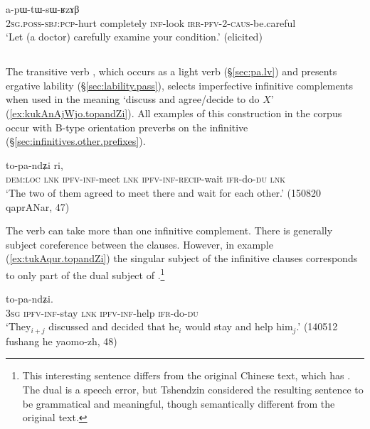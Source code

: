 \begin{exe} 
\ex \label{ex:kArtoR.apWtWsWRzAB}
 a-pɯ-tɯ-sɯ-ʁzɤβ \\
\textsc{2sg}.\textsc{poss}-\textsc{sbj}:\textsc{pcp}-hurt completely \textsc{inf}-look \textsc{irr}-\textsc{pfv}-2-\textsc{caus}-be.careful \\
\glt `Let (a doctor) carefully examine your condition.' (elicited)
\end{exe} 


\subsection{} \label{sec:pa.complements}
The transitive verb , which occurs as a light verb (§\ref{sec:pa.lv}) and presents ergative lability (§\ref{sec:lability.pass}), selects imperfective infinitive complements when used in the meaning `discuss and agree/decide to do $X$' (\ref{ex:kukAnAjWjo.topandZi}). All examples of this construction in the corpus occur with B-type orientation preverbs on the infinitive (§\ref{sec:infinitives.other.prefixes}). 

\begin{exe}
\ex \label{ex:kukAnAjWjo.topandZi}
 to-pa-ndʑi ri, \\
  \textsc{dem}:\textsc{loc} \textsc{lnk} \textsc{ipfv}-\textsc{inf}-meet \textsc{lnk} \textsc{ipfv}-\textsc{inf}-\textsc{recip}-wait \textsc{ifr}-do-\textsc{du} \textsc{lnk} \\
\glt `The two of them agreed to meet there and wait for each other.' (150820 qaprANar, 47)
 \end{exe}
 
The verb  can take more than one infinitive complement. There is generally subject coreference between the clauses. However, in example (\ref{ex:tukAqur.topandZi}) the singular subject of the infinitive clauses corresponds to only part of the dual subject of .\footnote{This interesting sentence differs from the original Chinese text, which has . The dual  is a speech error, but Tshendzin considered the resulting sentence to be grammatical and meaningful, though semantically different from the original text. }

\begin{exe}
\ex \label{ex:tukAqur.topandZi}
 to-pa-ndʑi. \\
\textsc{3sg} \textsc{ipfv}-\textsc{inf}-stay \textsc{lnk} \textsc{ipfv}-\textsc{inf}-help \textsc{ifr}-do-\textsc{du} \\
\glt `They$_{i+j}$ discussed and decided that he$_i$ would stay and help him$_j$.' (140512 fushang he yaomo-zh, 48)
\end{exe}

